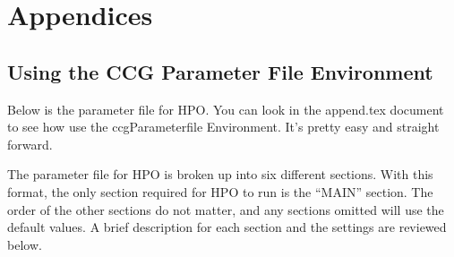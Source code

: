 
\chapter{Appendices}
\label{ch:append}

\section{Using the CCG Parameter File Environment}
\label{sect:parm_file}

    Below is the parameter file for \gls{HPO}. You can look in the append.tex document to see how use the ccgParameterfile Environment. It's pretty easy and straight forward.

    The parameter file for \gls{HPO} is broken up into six different sections. With this format, the only section required for \gls{HPO} to run is the ``MAIN'' section. The order of the other sections do not matter, and any sections omitted will use the default values. A brief description for each section and the settings are reviewed below.

